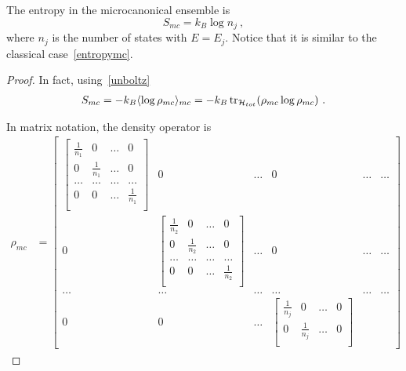     The entropy in the microcanonical ensemble is 
    \begin{equation*}
        S_{mc} = k_B \log n_j ~,
    \end{equation*}
    where $n_j$ is the number of states with $E = E_j$. Notice that it is similar to the classical case~\eqref{entropymc}.
    \begin{proof}
        In fact, using~\eqref{unboltz}
        \begin{equation*}
        \begin{aligned}
            S_{mc} = - k_B \langle\log \rho_{mc}\rangle_{mc} = - k_B \operatorname{tr}_{\mathcal H_{tot}} ( \rho_{mc} \log \rho_{mc}) ~.
        \end{aligned}
        \end{equation*}

        In matrix notation, the density operator is 
        \begin{equation*}
        \begin{aligned}
            \rho_{mc} & = \begin{bmatrix}
                \begin{bmatrix}
                    \frac{1}{n_1} & 0 & \ldots & 0 \\
                    0 & \frac{1}{n_1} & \ldots & 0 \\
                    \ldots & \ldots & \ldots & \ldots \\
                    0 & 0 & \ldots & \frac{1}{n_1} \\
                \end{bmatrix} & 0 & \ldots & 0 & \ldots & \ldots \\ 0 & 
                \begin{bmatrix}
                    \frac{1}{n_2} & 0 & \ldots & 0 \\
                    0 & \frac{1}{n_2} & \ldots & 0 \\
                    \ldots & \ldots & \ldots & \ldots \\
                    0 & 0 & \ldots & \frac{1}{n_2} \\
                \end{bmatrix} & \ldots & 0 & \ldots & \ldots \\ 
                \ldots & \ldots & \ldots & \ldots & \ldots & \ldots \\
                0 & 0 & \ldots & \begin{bmatrix}
                    \frac{1}{n_j} & 0 & \ldots & 0 \\
                    0 & \frac{1}{n_j} & \ldots & 0 \\

\end{bmatrix}
\end{bmatrix}
\end{aligned}
\end{equation*}
\end{proof}
